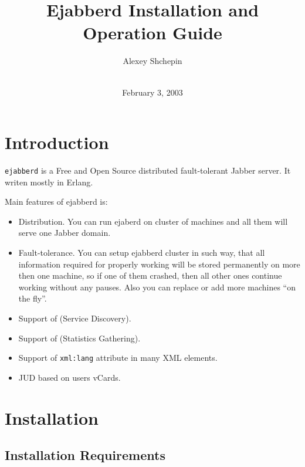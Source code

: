 \documentclass[10pt]{article}
\title{Ejabberd Installation and Operation Guide}
\author{Alexey Shchepin \\
  \ahrefurl{mailto:alexey@sevcom.net} \\
  \ahrefurl{xmpp:aleksey@jabber.ru}}
\date{February 3, 2003}
\newcommand{\imgscale}{0.7}
\newcommand{\insimg}[1]{
  \imgsrc{#1}{}
  \begin{latexonly}
    \scalebox{\imgscale}{\texttt{[image: \#1]}}
  \end{latexonly}
}
\newcommand{\ns}[1]{\texttt{#1}}
\newcommand{\ejabberd}{\texttt{ejabberd}}
\newcommand{\Jabber}{Jabber}
\begin{document}
\begin{titlepage}
  \maketitle{}
  
  {\centering
    \insimg{logo.png}
    \par
  }
\end{titlepage}
\tableofcontents{}

\newpage
\section{Introduction}
\label{sec:intro}

\ejabberd{} is a Free and Open Source distributed fault-tolerant \Jabber{}
server.  It writen mostly in Erlang.

Main features of ejabberd is:
\begin{itemize}
\item Distribution.  You can run ejaberd on cluster of machines and all them
  will serve one Jabber domain.
\item   Fault-tolerance.  You can setup ejabberd cluster in such way, that all
  information required for properly working will be stored permanently on more
  then one machine, so if one of them crashed, then all other ones continue
  working without any pauses.  Also you can replace or add more machines ``on
  the fly''.
\item Support of 
  (Service Discovery).
\item Support of 
  (Statistics Gathering).
\item Support of \ns{xml:lang} attribute in many XML elements.
\item JUD based on users vCards.
\end{itemize}




\section{Installation}
\label{sec:installation}


\subsection{Installation Requirements}
\label{sec:installreq}
\end{document}
